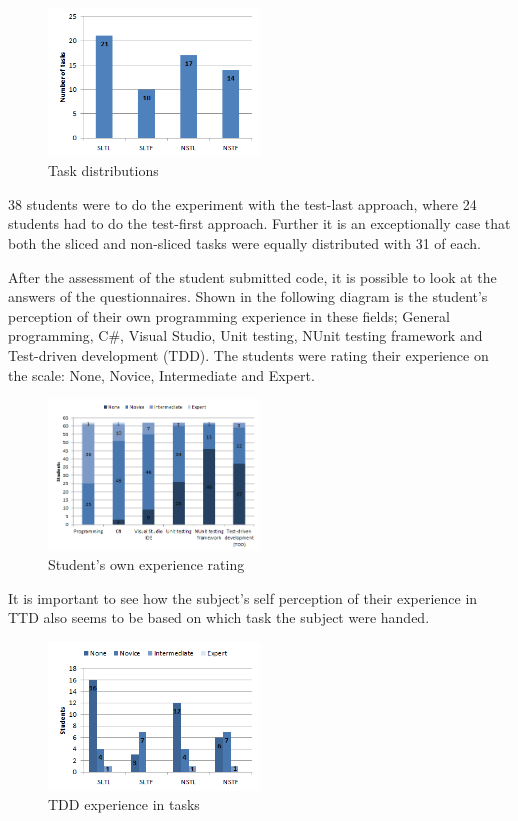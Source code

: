 \documentclass{sig-alternate-05-2015}
\begin{document}
\begin{figure}[H]
	\centering
	\includegraphics[width=0.5\textwidth]{img02}
	\caption{Task distributions}
\end{figure}

38 students were to do the experiment with the test-last approach, where 24 students had to do the test-first approach. Further it is an exceptionally case that both the sliced and non-sliced tasks were equally distributed with 31 of each.

After the assessment of the student submitted code, it is possible to look at the answers of the questionnaires. Shown in the following diagram is the student's perception of their own programming experience in these fields; General programming, C{\#}, Visual Studio, Unit testing, NUnit testing framework and Test-driven development (TDD).
The students were rating their experience on the scale: None, Novice, Intermediate and Expert.

\begin{figure}[H]
	\centering
	\includegraphics[width=0.5\textwidth]{img03}
	\caption{Student's own experience rating}
\end{figure}

It is important to see how the subject's self perception of their experience in TTD also seems to be based on which task the subject were handed.

\begin{figure}[H]
	\centering
	\includegraphics[width=0.5\textwidth]{img04}
	\caption{TDD experience in tasks}
\end{figure}
\end{document}
